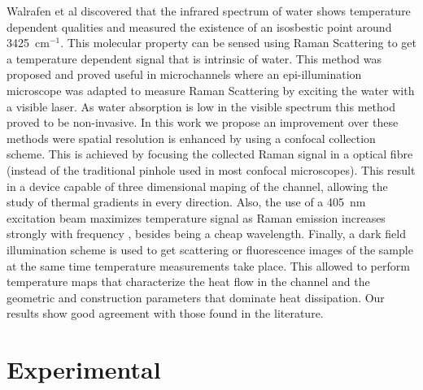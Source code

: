 \documentclass[twocolumn]{svjour3}       %
\begin{document}
Walrafen et al \cite{walrafen1} discovered that the infrared spectrum of water shows temperature dependent qualities and measured the existence of an isosbestic point around 3425~$\mathrm{cm^{-1}}$. This molecular property can be sensed using Raman Scattering to get a temperature dependent signal that is intrinsic of water. This method was proposed and proved useful in microchannels \cite{raman1}\cite{raman2}\cite{raman3} where an epi-illumination microscope was adapted to measure Raman Scattering by exciting the water with a visible laser. As water absorption is low in the visible spectrum \cite{absorption} this method proved to be non-invasive. In this work we propose an improvement over these methods were spatial resolution is enhanced by using a confocal collection scheme. This is achieved by focusing the collected Raman signal in a optical fibre (instead of the traditional pinhole used in most confocal microscopes). This result in a device capable of three dimensional maping of the channel, allowing the study of thermal gradients in every direction. Also, the use of a 405~nm excitation beam maximizes temperature signal as Raman emission increases strongly with frequency \cite{faris}, besides being a cheap wavelength. Finally, a dark field illumination scheme is used to get scattering or fluorescence images of the sample at the same time temperature measurements take place. This allowed to perform temperature maps that characterize the heat flow in the channel and the geometric and construction parameters that dominate heat dissipation. Our results show good agreement with those found in the literature. 

\section{Experimental}
\end{document}
